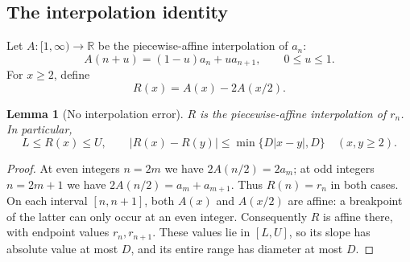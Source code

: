 \documentclass[11pt,a4paper]{article}
\numberwithin{equation}{section}
\newtheorem{lemma}[theorem]{Lemma}
\theoremstyle{definition}
\theoremstyle{remark}
\newcommand{\R}{\mathbb R}
\theoremstyle{definition}
\theoremstyle{plain}
\begin{document}
\subsection{The interpolation identity}
Let $A:[1,\infty)\to\R$ be the piecewise-affine interpolation of $a_n$:
\begin{equation}
 A(n+u)=(1-u)a_n+u a_{n+1},\qquad 0\le u\le1.
\end{equation}
For $x\ge2$, define
\begin{equation}
 R(x)=A(x)-2A(x/2).
\label{dsr:eq:R}
\end{equation}

\begin{lemma}[No interpolation error]
$R$ is the piecewise-affine interpolation of $r_n$. In particular,
\begin{equation}
 L\le R(x)\le U,\qquad
 |R(x)-R(y)|\le\min\{D|x-y|,D\}\quad(x,y\ge2).
\label{dsr:eq:Rbounds}
\end{equation}
\end{lemma}
\begin{proof}
At even integers $n=2m$ we have $2A(n/2)=2a_m$; at odd integers $n=2m+1$ we
have $2A(n/2)=a_m+a_{m+1}$. Thus $R(n)=r_n$ in both cases. On each interval
$[n,n+1]$, both $A(x)$ and $A(x/2)$ are affine: a breakpoint of the latter
can only occur at an even integer. Consequently $R$ is affine there, with
endpoint values $r_n,r_{n+1}$. These values lie in $[L,U]$, so its slope has
absolute value at most $D$, and its entire range has diameter at most $D$.
\end{proof}
\end{document}
